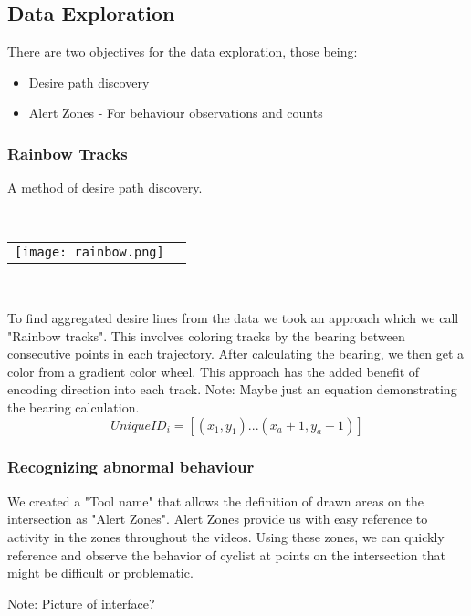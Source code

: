 \subsection{Data Exploration}
There are two objectives for the data exploration, those being:
\begin{itemize}
	\item Desire path discovery
	\item Alert Zones - For behaviour observations and counts
\end{itemize}

\subsubsection{Rainbow Tracks}

A method of desire path discovery.

\ \\ 
\noindent
\begin{tabular}{@{}cc}
\texttt{[image: rainbow.png]} 
\end{tabular}
\label{Rainbow}
\

To find aggregated desire lines from the data we took an approach which we call "Rainbow tracks". This involves coloring tracks by the bearing between consecutive points in each trajectory. After calculating the bearing, we then get a color from a gradient color wheel. This approach has the added benefit of encoding direction into 
each track.
Note: Maybe just an equation demonstrating the bearing calculation.
\ \\ 

\begin{equation}
  UniqueID_i = [(x_1, y_1)...(x_a+1, y_a+1)]\label{eq:3}
\end{equation}

\subsubsection{Recognizing abnormal behaviour}

We created a "Tool name" that allows the definition of drawn areas on the intersection as "Alert Zones". 
Alert Zones provide us with easy reference to activity in the zones throughout the videos. 
Using these zones, we can quickly reference and observe the behavior of cyclist at points on the 
intersection that might be difficult or problematic.

Note: Picture of interface?